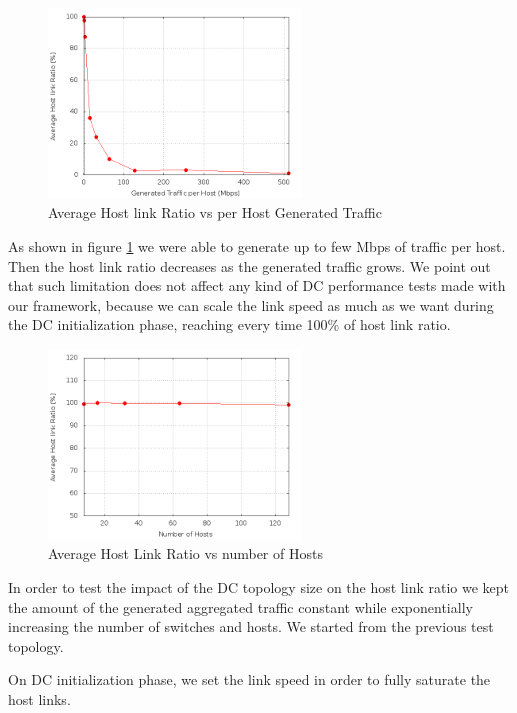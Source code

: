 \documentclass[12pt,english,oneside]{book}
\begin{document}
\begin{figure}[htbp]
        \centering
        \includegraphics[width=0.6\textwidth]{figures/bw_utilization.png}
        \caption{Average Host link Ratio vs per Host Generated Traffic}
        \label{fig:bw}
\end{figure}

As shown in figure \ref{fig:bw} we were able to generate up to few Mbps of traffic per host.
Then the host link ratio decreases as the generated traffic grows.
We point out that such limitation does not affect any kind of DC performance tests made with our framework,
because we can scale the link speed as much as we want during the DC initialization phase, reaching every time 100\% of host link ratio.

\begin{figure}[htbp]
        \centering
        \includegraphics[width=0.6\textwidth]{figures/topo.png}
        \caption{Average Host Link Ratio vs number of Hosts}
        \label{fig:topo}
\end{figure}

In order to test the impact of the DC topology size on the
host link ratio we kept the amount of the generated aggregated traffic 
constant while exponentially increasing the number of switches and hosts.
We started from the previous test topology.

On DC initialization phase, we set the link speed in order to fully saturate the host links.
\end{document}
